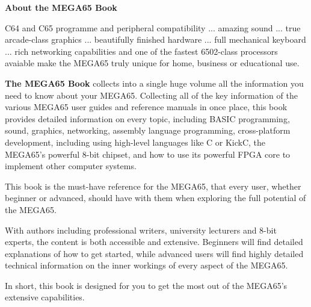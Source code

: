 \nocite{*}



\printindex

\cleardoublepage

\enlargethispage{3\baselineskip}
\thispagestyle{empty}
\pagecolor[HTML]{2244FF}

\begin{center}
\begin{minipage}{.8\textwidth}
\color{white}
\begin{center}
{ \huge\bfseries\sffamily\color{white}About the MEGA65 Book }
\end{center}

\vspace{3mm}
\hline
\vspace{3mm}

{
C64 and C65 programme and peripheral compatibility ... amazing sound ... true arcade-class graphics
... beautifully finished hardware ... full mechanical keyboard ... rich networking capabilities
and one of the fastest 6502-class processors avaiable make the MEGA65 truly unique for home, business
or educational use.

\vspace{2mm}

{\bf The MEGA65 Book} collects into a single huge volume all the information you need to know about
your MEGA65.  Collecting all of the key information of the various MEGA65 user guides and reference
manuals in once place, this book provides detailed information on every topic, including BASIC programming,
sound, graphics, networking, assembly language programming, cross-platform development, including using
high-level languages like C or KickC, the MEGA65's powerful 8-bit chipset, and how to use its powerful
FPGA core to implement other computer systems.

\vspace{2mm}

This book is the must-have reference for the MEGA65, that every user, whether beginner or advanced, should
have with them when exploring the full potential of the MEGA65.

\vspace{2mm}

With authors including professional writers, university lecturers and 8-bit experts, the content is
both accessible and extensive.  Beginners will find detailed explanations of how to get started,
while advanced users will find highly detailed technical information on the inner workings of  every
aspect of the MEGA65.

\vspace{2mm}

In short, this book is designed for you to get the most out of the MEGA65's extensive capabilities.
}

\end{minipage}
\end{center}

